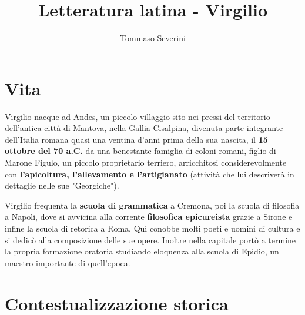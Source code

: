 \documentclass[10pt,a4paper]{article}
\author{Tommaso Severini}
\title{Letteratura latina - Virgilio}
\begin{document}
	\maketitle
	
	\section*{Vita}
	
	Virgilio nacque ad Andes, un piccolo villaggio sito nei pressi del territorio dell'antica città di Mantova, nella Gallia Cisalpina, divenuta parte integrante dell'Italia romana quasi una ventina d'anni prima della sua nascita, il \textbf{15 ottobre del 70 a.C.} da una benestante famiglia di coloni romani, figlio di Marone Figulo, un piccolo proprietario terriero, arricchitosi considerevolmente con \textbf{l'apicoltura, l'allevamento e l'artigianato} (attività che lui descriverà in dettaglie nelle sue "Georgiche").
	
	Virgilio frequenta la \textbf{scuola di grammatica} a Cremona, poi la scuola di filosofia a Napoli, dove si avvicina alla corrente \textbf{filosofica epicureista} grazie a Sirone e infine la scuola di retorica a Roma. Qui conobbe molti poeti e uomini di cultura e si dedicò alla composizione delle sue opere. Inoltre nella capitale portò a termine la propria formazione oratoria studiando eloquenza alla scuola di Epidio, un maestro importante di quell'epoca.
	
	\section*{Contestualizzazione storica} 
	
\end{document}
